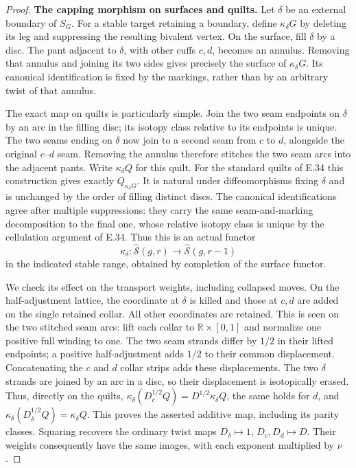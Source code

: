 \begin{proof}
\noindent\textbf{The capping morphism on surfaces and quilts.}
Let $\delta$ be an external boundary of
$S_G$.  For a stable target retaining a
boundary, define $\kappa_\delta G$ by
deleting its leg and suppressing the
resulting bivalent vertex.  On the surface,
fill $\delta$ by a disc.  The pant adjacent
to $\delta$, with other cuffs $c,d$,
becomes an annulus.  Removing that annulus
and joining its two sides gives precisely
the surface of $\kappa_\delta G$.
Its canonical identification is fixed by
the markings, rather than by an arbitrary
twist of that annulus.

The exact map on quilts is particularly
simple.  Join the two seam endpoints on
$\delta$ by an arc in the filling disc;
its isotopy class relative to its endpoints
is unique.  The two seams ending on
$\delta$ now join to a second seam from
$c$ to $d$, alongside the original
$c$--$d$ seam.  Removing the annulus
therefore stitches the two seam arcs
into the adjacent pants.  Write
$\kappa_\delta Q$ for this quilt.
For the standard quilts of E.34 this
construction gives exactly
$Q_{\kappa_\delta G}$.
It is natural under diffeomorphisms
fixing $\delta$ and is unchanged by
the order of filling distinct discs.
The canonical identifications agree
after multiple suppressions: they
carry the same seam-and-marking
decomposition to the final one, whose
relative isotopy class is unique by
the cellulation argument of E.34.
Thus this is an actual functor
\[
 \kappa_\delta:\widehat{\mathcal S}(g,r)
       \longrightarrow\widehat{\mathcal S}(g,r-1)
                                                               \tag{E.130}
\]
in the indicated stable range, obtained
by completion of the surface functor.

We check its effect on the transport
weights, including collapsed moves.
On the half-adjustment lattice,
the coordinate at $\delta$ is killed
and those at $c,d$ are added on the
single retained collar.  All other
coordinates are retained.  This is
seen on the two stitched seam arcs:
lift each collar to
$\mathbb R\times[0,1]$ and normalize
one positive full winding to one.
The two seam strands differ by
$1/2$ in their lifted endpoints;
a positive half-adjustment adds
$1/2$ to their common displacement.
Concatenating the $c$ and $d$
collar strips adds these
displacements.  The two $\delta$
strands are joined by an arc in
a disc, so their displacement
is isotopically erased.  Thus,
directly on the quilts,
$\kappa_\delta(D_c^{1/2}Q)
=D^{1/2}\kappa_\delta Q$,
the same holds for $d$, and
$\kappa_\delta(D_\delta^{1/2}Q)
=\kappa_\delta Q$.
This proves the asserted additive
map, including its parity classes.
Squaring recovers the ordinary
twist maps
$D_\delta\mapsto1$, $D_c,D_d\mapsto D$.
Their weights consequently have
the same images, with each exponent
multiplied by $\nu$.


\end{proof}
